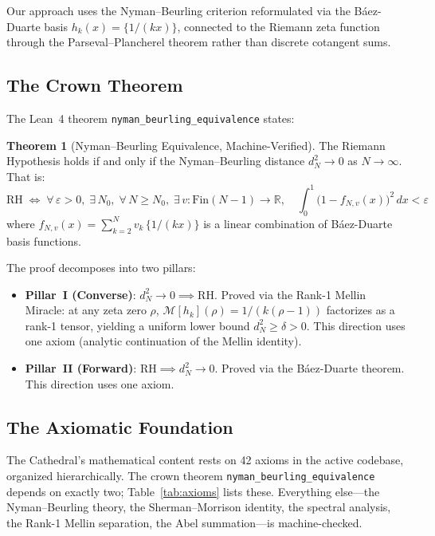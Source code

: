 \documentclass[11pt,a4paper]{article}
\theoremstyle{definition}
\newtheorem{theorem}[definition]{Theorem}
\newcommand{\RH}{\mathrm{RH}}
\newcommand{\RR}{\mathbb{R}}
\newcommand{\lean}[1]{\texttt{#1}}
\begin{document}
Our approach uses the Nyman--Beurling criterion \cite{nyman1950,beurling1955}
reformulated via the B\'aez-Duarte basis \cite{baezduarte2003}
$h_k(x) = \{1/(kx)\}$, connected to the Riemann zeta function through the
Parseval--Plancherel theorem rather than discrete cotangent sums.

\subsection{The Crown Theorem}

The Lean~4 theorem \lean{nyman\_beurling\_equivalence} states:
\begin{theorem}[Nyman--Beurling Equivalence, Machine-Verified]
\label{thm:crown}
The Riemann Hypothesis holds if and only if the Nyman--Beurling distance
$d_N^2 \to 0$ as $N \to \infty$. That is:
\[
  \RH \;\iff\;
  \forall\,\varepsilon > 0,\;\exists\,N_0,\;\forall\,N \geq N_0,\;
  \exists\,v : \mathrm{Fin}(N-1) \to \RR,\quad
  \int_0^1 \bigl(1 - f_{N,v}(x)\bigr)^2\,dx < \varepsilon
\]
where $f_{N,v}(x) = \sum_{k=2}^{N} v_k\,\{1/(kx)\}$ is a linear combination
of B\'aez-Duarte basis functions.
\end{theorem}

The proof decomposes into two pillars:
\begin{itemize}
  \item \textbf{Pillar~I (Converse)}: $d_N^2 \to 0 \implies \RH$.
    Proved via the Rank-1 Mellin Miracle: at any zeta zero $\rho$,
    $\mathcal{M}[h_k](\rho) = 1/(k(\rho-1))$ factorizes as a rank-1
    tensor, yielding a uniform lower bound $d_N^2 \geq \delta > 0$.
    This direction uses one axiom (analytic continuation of the Mellin identity).
  \item \textbf{Pillar~II (Forward)}: $\RH \implies d_N^2 \to 0$.
    Proved via the B\'aez-Duarte theorem. This direction uses one axiom.
\end{itemize}

\subsection{The Axiomatic Foundation}

The Cathedral's mathematical content rests on 42 axioms in the active
codebase, organized hierarchically. The crown theorem
\lean{nyman\_beurling\_equivalence} depends on exactly two;
Table~\ref{tab:axioms} lists these. Everything else---the Nyman--Beurling
theory, the Sherman--Morrison identity, the spectral analysis, the
Rank-1 Mellin separation, the Abel summation---is machine-checked.
\end{document}
